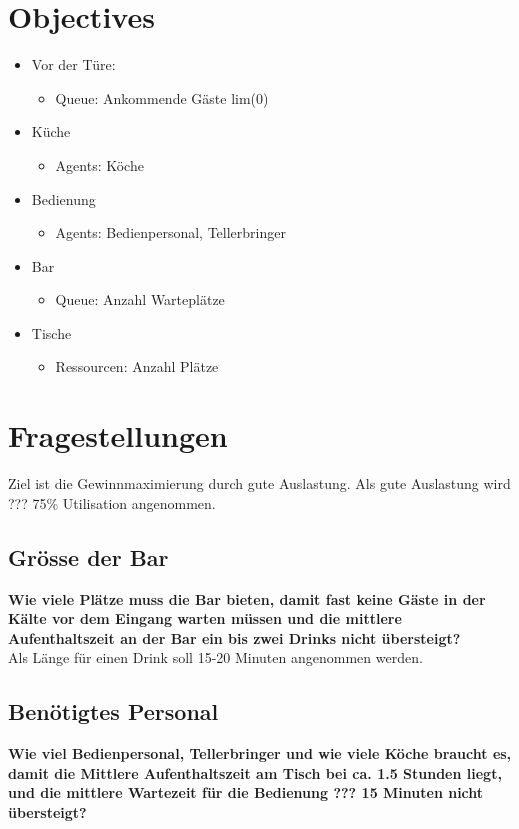 \documentclass[ngerman,a4paper,12pt]{scrreprt}
\begin{document}
\section{Objectives}
	\begin{itemize}
		\item Vor der Türe:
			\begin{itemize}
				\item Queue: Ankommende Gäste lim(0)
			\end{itemize}
		\item Küche
			\begin{itemize}
				\item Agents: Köche
			\end{itemize}
		\item Bedienung
			\begin{itemize}
				\item Agents: Bedienpersonal, Tellerbringer
			\end{itemize}
		\item Bar
			\begin{itemize}
				\item Queue: Anzahl Warteplätze
			\end{itemize}
		\item Tische
			\begin{itemize}
				\item Ressourcen: Anzahl Plätze
			\end{itemize}
	\end{itemize}



\section{Fragestellungen}
	Ziel ist die Gewinnmaximierung durch gute Auslastung. Als gute Auslastung wird ??? 75\% Utilisation angenommen.
	
	\subsection{Grösse der Bar}
		\textbf{Wie viele Plätze muss die Bar bieten, damit fast keine Gäste in der Kälte vor dem Eingang warten müssen und die mittlere Aufenthaltszeit an der Bar ein bis zwei Drinks nicht übersteigt?} \\
		Als Länge für einen Drink soll 15-20 Minuten angenommen werden.

	\subsection{Benötigtes Personal}
		\textbf{Wie viel Bedienpersonal, Tellerbringer und wie viele Köche braucht es, damit die Mittlere Aufenthaltszeit am Tisch bei ca. 1.5 Stunden liegt, und die mittlere Wartezeit für die Bedienung ??? 15 Minuten nicht übersteigt?} \\
\end{document}
